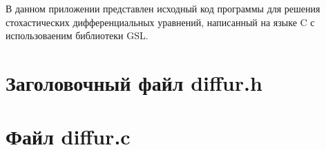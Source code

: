 
В данном приложении представлен исходный код программы
для решения стохастических дифференциальных уравнений,
написанный на языке C с использоваеним библиотеки GSL.

\chapter{Заголовочный файл diffur.h}
\label{app3:1}



\chapter{Файл diffur.c}
\label{app3:2}



